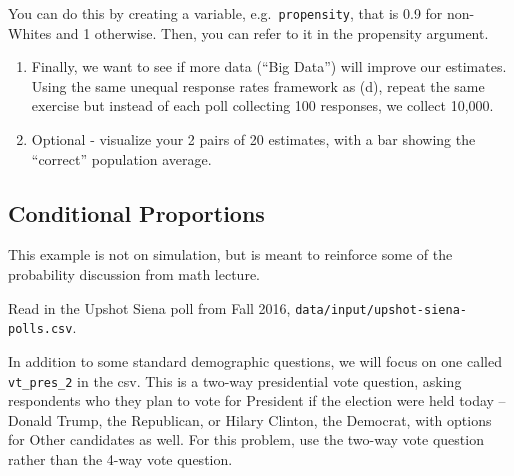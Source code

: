 \documentclass[
]{book}
\theoremstyle{definition}
\theoremstyle{definition}
\theoremstyle{definition}
\theoremstyle{remark}
\begin{document}
You can do this by creating a variable, e.g.~\texttt{propensity}, that is 0.9 for non-Whites and 1 otherwise. Then, you can refer to it in the propensity argument.

\begin{enumerate}
\def\labelenumi{(\alph{enumi})}
\setcounter{enumi}{4}
\item
  Finally, we want to see if more data (``Big Data'') will improve our estimates. Using the same unequal response rates framework as (d), repeat the same exercise but instead of each poll collecting 100 responses, we collect 10,000.
\item
  Optional - visualize your 2 pairs of 20 estimates, with a bar showing the ``correct'' population average.
\end{enumerate}

\hypertarget{conditional-proportions}{%
\subsection*{Conditional Proportions}\label{conditional-proportions}}

This example is not on simulation, but is meant to reinforce some of the probability discussion from math lecture.

Read in the Upshot Siena poll from Fall 2016, \texttt{data/input/upshot-siena-polls.csv}.

In addition to some standard demographic questions, we will focus on one called \texttt{vt\_pres\_2} in the csv. This is a two-way presidential vote question, asking respondents who they plan to vote for President if the election were held today -- Donald Trump, the Republican, or Hilary Clinton, the Democrat, with options for Other candidates as well. For this problem, use the two-way vote question rather than the 4-way vote question.
\end{document}
